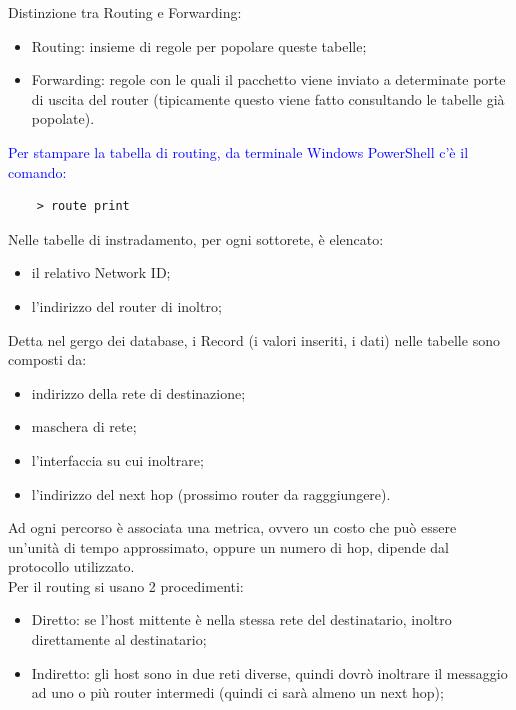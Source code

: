 \noindent Distinzione tra Routing e Forwarding:
\begin{itemize}
    \item Routing: insieme di regole per popolare queste tabelle;
    \item Forwarding: regole con le quali il pacchetto viene inviato a determinate porte di uscita del router (tipicamente questo viene fatto consultando le tabelle già popolate).
\end{itemize}

\noindent\textcolor{Blue}{Per stampare la tabella di routing, da terminale Windows PowerShell c'è il comando:}\begin{verbatim}
    > route print
\end{verbatim}
\noindent Nelle tabelle di instradamento, per ogni sottorete, è elencato:
\begin{itemize}
    \item il relativo Network ID;
    \item l'indirizzo del router di inoltro;
\end{itemize}

\noindent Detta nel gergo dei database, i Record (i valori inseriti, i dati) nelle tabelle sono composti da: \begin{itemize}
    \item indirizzo della rete di destinazione;
    \item maschera di rete;
    \item l'interfaccia su cui inoltrare;
    \item l'indirizzo del next hop (prossimo router da ragggiungere).
\end{itemize}

\noindent Ad ogni percorso è associata una metrica, ovvero un costo che può essere un'unità di tempo approssimato, oppure un numero di hop, dipende dal protocollo utilizzato.\\

\noindent Per il routing si usano 2 procedimenti:
\begin{itemize}
    \item Diretto: se l'host mittente è nella stessa rete del destinatario, inoltro direttamente al destinatario;
    \item Indiretto: gli host sono in due reti diverse, quindi dovrò inoltrare il messaggio ad uno o più router intermedi (quindi ci sarà almeno un next hop);
\end{itemize}


